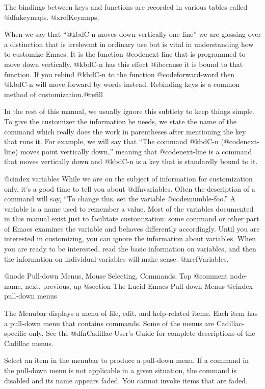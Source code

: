 {{  The bindings between keys and functions are recorded in various tables
called @dfn{keymaps}.  @xref{Keymaps}.

  When we say that ``@kbd{C-n} moves down vertically one line'' we are
glossing over a distinction that is irrelevant in ordinary use but is vital
in understanding how to customize Emacs.  It is the function
@code{next-line} that is programmed to move down vertically.  @kbd{C-n} has
this effect @i{because} it is bound to that function.  If you rebind
@kbd{C-n} to the function @code{forward-word} then @kbd{C-n} will move
forward by words instead.  Rebinding keys is a common method of
customization.@refill

  In the rest of this manual, we usually ignore this subtlety to keep
things simple.  To give the customizer the information he needs, we
state the name of the command which really does the work in parentheses
after mentioning the key that runs it.  For example, we will say that
``The command @kbd{C-n} (@code{next-line}) moves point vertically down,''
meaning that @code{next-line} is a command that moves vertically down
and @kbd{C-n} is a key that is standardly bound to it.

@cindex variables
  While we are on the subject of information for customization only, it's a
good time to tell you about @dfn{variables}.  Often the description of a
command will say, ``To change this, set the variable @code{mumble-foo}.''
A variable is a name used to remember a value.  Most of the variables
documented in this manual exist just to facilitate customization: some
command or other part of Emacs examines the variable and behaves
differently accordingly.  Until you are interested in customizing, you can
ignore the information about variables.  When you are ready to be
interested, read the basic information on variables, and then the
information on individual variables will make sense.  @xref{Variables}.

@node Pull-down Menus, Mouse Selecting, Commands, Top
@comment  node-name,  next,  previous,  up
@section The Lucid Emacs Pull-down Menus 
@cindex pull-down menus

The Menubar displays a menu of file, edit, and help-related items.  Each item
has a pull-down menu that contains commands.
Some of the menus 
are Cadillac-specific only. See the @dfn{Cadillac User's Guide} for 
complete descriptions of the Cadillac 
menus.  

Select an item in the menubar to 
produce a pull-down menu. If a command in the pull-down menu is not 
applicable in a given situation, the command is disabled and its name 
appears faded. You cannot invoke items that are faded.

}}
